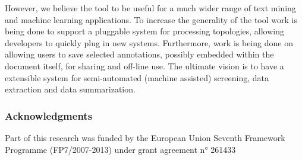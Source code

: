 \documentclass[runningheads,a4paper]{llncs}
\begin{document}
However, we believe the tool to be useful for a much wider range of text mining and machine learning applications.
To increase the generality of the tool work is being done to support a pluggable system for processing topologies, allowing developers to quickly plug in new systems.
Furthermore, work is being done on allowing users to save selected annotations, possibly embedded within the document itself, for sharing and off-line use.
The ultimate vision is to have a extensible system for semi-automated (machine assisted) screening, data extraction and data summarization.

\subsubsection{Acknowledgments}
Part of this research was funded by the European Union Seventh Framework Programme (FP7/2007-2013) under grant agreement n° 261433



\end{document}
